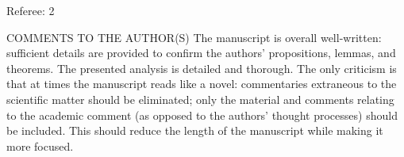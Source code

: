 \documentclass[12pt]{article}
\begin{document}
Referee: 2

COMMENTS TO THE AUTHOR(S) The manuscript is overall well-written: sufficient
details are provided to confirm the authors' propositions, lemmas, and theorems.
The presented analysis is detailed and thorough. The only criticism is that at
times the manuscript reads like a novel: commentaries extraneous to the
scientific matter should be eliminated; only the material and comments relating
to the academic comment (as opposed to the authors' thought processes) should be
included. This should reduce the length of the manuscript while making it more
focused.
\end{document}
